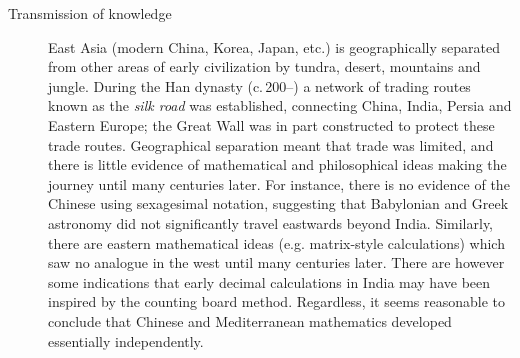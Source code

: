 \begin{description}
  \item[Transmission of knowledge] East Asia (modern China, Korea, Japan, etc.) is geographically separated from other areas of early civilization by tundra, desert, mountains and jungle. During the Han dynasty (c.\,200\BC--) a network of trading routes known as the \emph{silk road} was established, connecting China, India, Persia and Eastern Europe; the Great Wall was in part constructed to protect these trade routes.
  Geographical separation meant that trade was limited, and there is little evidence of mathematical and philosophical ideas making the journey until many centuries later. For instance, there is no evidence of the Chinese using sexagesimal notation, suggesting that Babylonian and Greek astronomy did not significantly travel eastwards beyond India. Similarly, there are eastern mathematical ideas (e.g.{} matrix-style calculations) which saw no analogue in the west until many centuries later. There are however some indications that early decimal calculations in India may have been inspired by the counting board method. Regardless, it seems reasonable to conclude that Chinese and Mediterranean mathematics developed essentially independently.
\end{description}

\goodbreak


